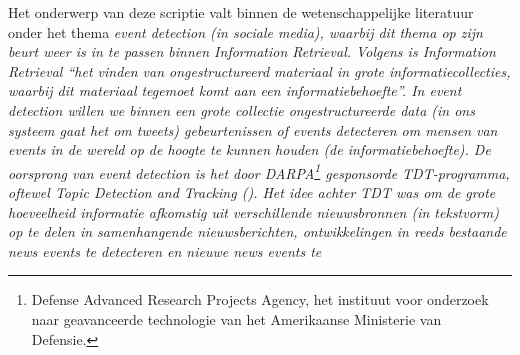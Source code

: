 Het onderwerp van deze scriptie valt binnen de wetenschappelijke literatuur 
onder het thema \it{event detection} (in sociale media), waarbij dit thema op zijn beurt weer is in te 
passen binnen \it{Information Retrieval}. Volgens \citeauthor{manning2008introduction} is Information 
Retrieval \it{“het vinden van ongestructureerd materiaal in grote 
informatiecollecties, waarbij dit materiaal tegemoet komt aan een 
informatiebehoefte”}. In event detection willen we binnen een grote collectie 
ongestructureerde data (in ons systeem gaat het om tweets) 
gebeurtenissen of \it{events} detecteren om mensen van events in de wereld op de 
hoogte te kunnen houden (de informatiebehoefte). 
\vl
De oorsprong van event detection is het door DARPA\footnote{Defense Advanced Research Projects Agency, het instituut voor onderzoek naar geavanceerde technologie van het Amerikaanse Ministerie van Defensie.} gesponsorde TDT-programma, 
oftewel \it{Topic Detection and Tracking} (\citealt{atefeh2013survey}). Het idee achter TDT was om 
de grote hoeveelheid informatie afkomstig uit verschillende 
nieuwsbronnen (in tekstvorm) op te delen in samenhangende nieuwsberichten, ontwikkelingen in 
reeds bestaande \it{news events} te detecteren en nieuwe news events te 
